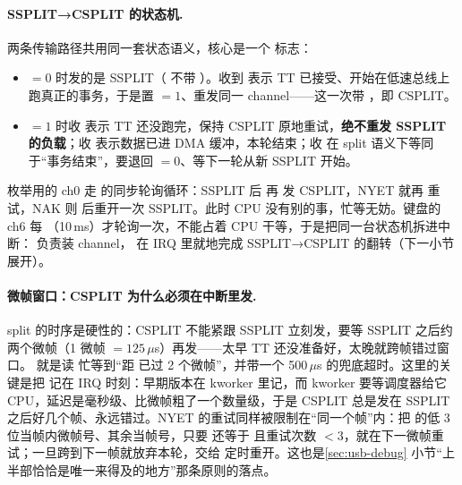 \paragraph{SSPLIT→CSPLIT 的状态机.}
两条传输路径共用同一套状态语义，核心是一个  标志：
\begin{itemize}
  \item {}$=0$ 时发的是 SSPLIT（ 不带 ）。收到  表示 TT 已接受、开始在低速总线上跑真正的事务，于是置 $=1$、重发同一 channel——这一次带 ，即 CSPLIT。
  \item {}$=1$ 时收  表示 TT 还没跑完，保持 CSPLIT 原地重试，\textbf{绝不重发 SSPLIT 的负载}；收  表示数据已进 DMA 缓冲，本轮结束；收  在 split 语义下等同于“事务结束”，要退回 $=0$、等下一轮从新 SSPLIT 开始。
\end{itemize}
枚举用的 ch0 走  的同步轮询循环：SSPLIT 后  再  发 CSPLIT，NYET 就再  重试，NAK 则  后重开一次 SSPLIT。此时 CPU 没有别的事，忙等无妨。键盘的 ch6 每 （10\,ms）才轮询一次，不能占着 CPU 干等，于是把同一台状态机拆进中断： 负责装 channel， 在 IRQ 里就地完成 SSPLIT→CSPLIT 的翻转（下一小节展开）。

\paragraph{微帧窗口：CSPLIT 为什么必须在中断里发.}
split 的时序是硬性的：CSPLIT 不能紧跟 SSPLIT 立刻发，要等 SSPLIT 之后约两个微帧（1 微帧 $=125\,\mu$s）再发——太早 TT 还没准备好，太晚就跨帧错过窗口。 就是读  忙等到“距  已过 2 个微帧”，并带一个 500\,$\mu$s 的兜底超时。这里的关键是把  记在 IRQ 时刻：早期版本在 kworker 里记，而 kworker 要等调度器给它 CPU，延迟是毫秒级、比微帧粗了一个数量级，于是 CSPLIT 总是发在 SSPLIT 之后好几个帧、永远错过。NYET 的重试同样被限制在“同一个帧”内：把  的低 3 位当帧内微帧号、其余当帧号，只要  还等于  且重试次数 $<3$，就在下一微帧重试；一旦跨到下一帧就放弃本轮，交给  定时重开。这也是\ref{sec:usb-debug} 小节“上半部恰恰是唯一来得及的地方”那条原则的落点。


